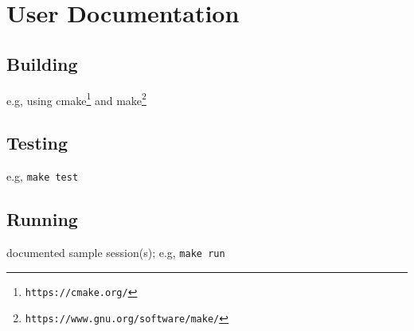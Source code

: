 \documentclass{book}
\begin{document}



\appendix

\chapter{User Documentation} \label{ch:userdoc}

\section{Building}

e.g, using cmake\footnote{\tt https://cmake.org/} and make\footnote{\tt https://www.gnu.org/software/make/}


\section{Testing}

e.g, \verb!make test!

\section{Running}

documented sample session(s); e.g, \verb!make run!
\end{document}

